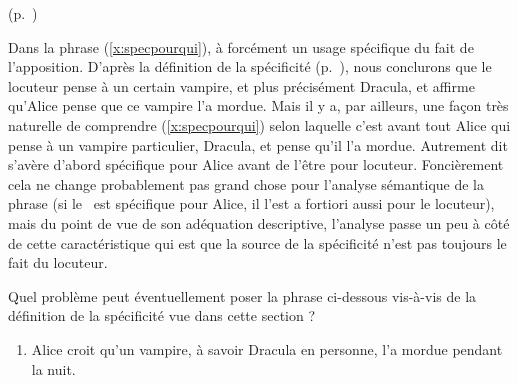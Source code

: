 \begin{exo} \label{exo:specdicto}
\begin{solu}(p.~\pageref{exo:specdicto})\label{crg:specdicto}

Dans la phrase (\ref{x:specpourqui}),  à forcément un usage spécifique du fait de l'apposition.  D'après la définition de la spécificité (p.~\pageref{def:spécificité}), nous conclurons que le locuteur pense à un certain vampire, et plus précisément Dracula, et affirme qu'Alice pense que ce vampire l'a mordue.  Mais il y a, par ailleurs, une façon très naturelle de comprendre (\ref{x:specpourqui}) selon laquelle c'est avant tout Alice qui pense à un vampire particulier, Dracula, et pense qu'il l'a mordue.  Autrement dit  s'avère d'abord spécifique pour Alice avant de l'être pour locuteur.  Foncièrement cela ne change probablement pas grand chose pour l'analyse sémantique de la phrase (si le \GN\ est spécifique pour Alice, il l'est a fortiori aussi pour le locuteur), mais du point de vue de son adéquation descriptive,   l'analyse passe un peu à côté de cette caractéristique qui est que la source de la spécificité n'est pas toujours le fait du locuteur.
\end{solu}
Quel problème peut éventuellement 
%
poser la phrase ci-dessous vis-à-vis de la définition de la
spécificité vue dans cette section ?

\begin{enumerate}
\item \label{x:specpourqui}
Alice croit qu'un vampire, à savoir Dracula en personne, l'a mordue
pendant la nuit.
\end{enumerate}
\end{exo}
